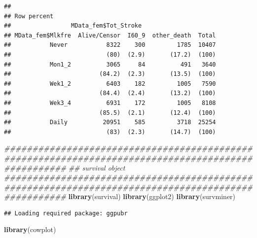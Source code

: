 \documentclass[
]{article}
\newenvironment{Shaded}{\begin{snugshade}}{\end{snugshade}}
\newcommand{\CommentTok}[1]{\textcolor[rgb]{0.56,0.35,0.01}{\textit{#1}}}
\newcommand{\DataTypeTok}[1]{\textcolor[rgb]{0.13,0.29,0.53}{#1}}
\newcommand{\KeywordTok}[1]{\textcolor[rgb]{0.13,0.29,0.53}{\textbf{#1}}}
\newcommand{\NormalTok}[1]{#1}
\newcommand{\OperatorTok}[1]{\textcolor[rgb]{0.81,0.36,0.00}{\textbf{#1}}}
\newcommand{\OtherTok}[1]{\textcolor[rgb]{0.56,0.35,0.01}{#1}}
\newcommand{\StringTok}[1]{\textcolor[rgb]{0.31,0.60,0.02}{#1}}
\begin{document}
\begin{Shaded}
\end{Shaded}

\begin{verbatim}
## 
## Row percent 
##                 MData_fem$Tot_Stroke
## MData_fem$Mlkfre  Alive/Censor  I60_9  other_death  Total
##           Never           8322    300         1785  10407
##                           (80)  (2.9)       (17.2)  (100)
##           Mon1_2          3065     84          491   3640
##                         (84.2)  (2.3)       (13.5)  (100)
##           Wek1_2          6403    182         1005   7590
##                         (84.4)  (2.4)       (13.2)  (100)
##           Wek3_4          6931    172         1005   8108
##                         (85.5)  (2.1)       (12.4)  (100)
##           Daily          20951    585         3718  25254
##                           (83)  (2.3)       (14.7)  (100)
\end{verbatim}

\begin{Shaded}
\begin{Highlighting}[]
\CommentTok{\#\#\#\#\#\#\#\#\#\#\#\#\#\#\#\#\#\#\#\#\#\#\#\#\#\#\#\#\#\#\#\#\#\#\#\#\#\#\#\#\#\#\#\#\#\#\#\#\#\#\#\#\#\#\#\#\#\#\#\#\#\#\#\#\#\#\#\#\#\#\#\#\#\#\#\#\#\#\#\#\#\#\#\#\#\#\#\#\#\#\#\#\#\#\#\#\#\#\#}
\CommentTok{\#\# survival object}
\CommentTok{\#\#\#\#\#\#\#\#\#\#\#\#\#\#\#\#\#\#\#\#\#\#\#\#\#\#\#\#\#\#\#\#\#\#\#\#\#\#\#\#\#\#\#\#\#\#\#\#\#\#\#\#\#\#\#\#\#\#\#\#\#\#\#\#\#\#\#\#\#\#\#\#\#\#\#\#\#\#\#\#\#\#\#\#\#\#\#\#\#\#\#\#\#\#\#\#\#\#\#}
\KeywordTok{library}\NormalTok{(survival)}
\KeywordTok{library}\NormalTok{(ggplot2)}
\KeywordTok{library}\NormalTok{(survminer)}
\end{Highlighting}
\end{Shaded}

\begin{verbatim}
## Loading required package: ggpubr
\end{verbatim}

\begin{Shaded}
\begin{Highlighting}[]
\KeywordTok{library}\NormalTok{(cowplot)}
\end{Highlighting}
\end{Shaded}
\end{document}
